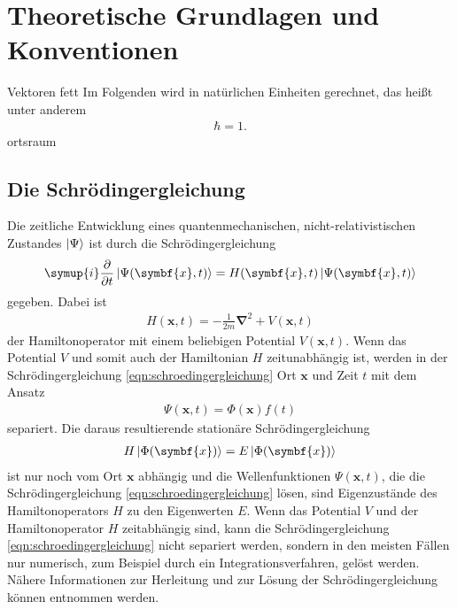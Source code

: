 \chapter{Theoretische Grundlagen und Konventionen}

Vektoren fett
Im Folgenden wird in natürlichen Einheiten gerechnet, das heißt unter anderem
\begin{align}
  \hbar = 1.
\end{align}
ortsraum

\section{Die Schrödingergleichung}
\label{sec:schroedingergleichung}

Die zeitliche Entwicklung eines quantenmechanischen, nicht-relativistischen Zustandes $\ket{\Psi}$ ist durch die Schrödingergleichung
\begin{align}
  \symup{i} \frac{\partial}{\partial t} \ket{\Psi(\symbf{x},t)} = H(\symbf{x},t) \ket{\Psi(\symbf{x},t)}
  \label{eqn:schroedingergleichung}
\end{align}
gegeben. Dabei ist
\begin{align}
  H(\symbf{x},t) = -\frac1{2 m} \symbf{\nabla}^2 + V(\symbf{x},t)
  \label{eqn:hamiltonian}
\end{align}
der Hamiltonoperator mit einem beliebigen Potential $V(\symbf{x},t)$.
Wenn das Potential $V$ und somit auch der Hamiltonian $H$ zeitunabhängig ist, werden in der Schrödingergleichung \eqref{eqn:schroedingergleichung} Ort $\symbf{x}$ und Zeit $t$ mit dem Ansatz
\begin{align}
  \Psi(\symbf{x},t) = \Phi(\symbf{x})f(t)
  \label{eqn:separation}
\end{align}
separiert. Die daraus resultierende stationäre Schrödingergleichung
\begin{align}
  H \ket{\Phi(\symbf{x})} = E \ket{\Phi(\symbf{x})}
  \label{eqn:statschroedinger}
\end{align}
ist nur noch vom Ort $\symbf{x}$ abhängig und die Wellenfunktionen $\Psi(\symbf{x},t)$, die die Schrödingergleichung \eqref{eqn:schroedingergleichung} lösen, sind Eigenzustände des Hamiltonoperators $H$ zu den Eigenwerten $E$.
Wenn das Potential $V$ und der Hamiltonoperator $H$ zeitabhängig sind, kann die Schrödingergleichung \eqref{eqn:schroedingergleichung} nicht separiert werden, sondern in den meisten Fällen nur numerisch, zum Beispiel durch ein Integrationsverfahren, gelöst werden.
Nähere Informationen zur Herleitung und zur Lösung der Schrödingergleichung können \cite{schwabl} entnommen werden.

